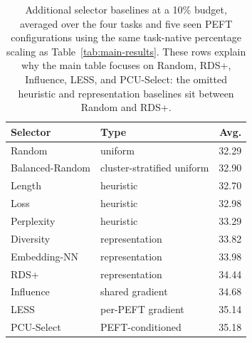 \begin{table}[t]
\centering
\small
\setlength{\tabcolsep}{5pt}
\caption{Additional selector baselines at a 10\% budget, averaged over the four tasks and five seen PEFT configurations using the same task-native percentage scaling as Table~\ref{tab:main-results}. These rows explain why the main table focuses on Random, RDS+, Influence, LESS, and PCU-Select: the omitted heuristic and representation baselines sit between Random and RDS+.}
\label{tab:extra-baselines}
\begin{tabular}{llr}
\toprule
Selector & Type & Avg. \\
\midrule
Random & uniform & 32.29 \\
Balanced-Random & cluster-stratified uniform & 32.90 \\
Length & heuristic & 32.70 \\
Loss & heuristic & 32.98 \\
Perplexity & heuristic & 33.29 \\
Diversity & representation & 33.82 \\
Embedding-NN & representation & 33.98 \\
RDS+ & representation & 34.44 \\
Influence & shared gradient & 34.68 \\
LESS & per-PEFT gradient & 35.14 \\
PCU-Select & PEFT-conditioned & 35.18 \\
\bottomrule
\end{tabular}
\end{table}
